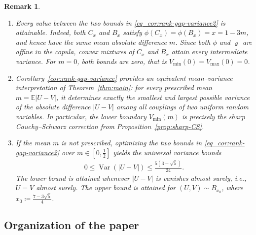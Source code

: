 \documentclass{article}
\newtheorem{remark}[theorem]{Remark}
\newcommand{\Var}{\operatorname{Var}}
\newcommand{\E}{\mathbb{E}}
\begin{document}
\begin{remark}
\label{rem:mean-variance-consequences}
\begin{enumerate}[label = (\alph*)]
    \item Every value between the two bounds in \eqref{eq_cor:rank-gap-variance2} is attainable.
    Indeed, both \(C_x\) and \(B_x\) satisfy \(\phi(C_x) = \phi(B_x)=x=1-3m\), and hence have the same mean absolute difference \(m\).
    Since both \(\phi\) and \(\varrho\) are affine in the copula, convex mixtures of \(C_x\) and \(B_x\) attain every intermediate variance.
    For \(m=0\), both bounds are zero, that is \(V_{\operatorname{min}}(0)=V_{\operatorname{max}}(0)=0\).

    \item Corollary~\ref{cor:rank-gap-variance} provides an equivalent mean--variance interpretation of Theorem~\ref{thm:main}: for every prescribed mean \(m=\E|U-V|\), it determines exactly the smallest and largest possible variance of the absolute difference \(|U-V|\) among all couplings of two uniform random variables.
    In particular, the lower boundary \(V_{\operatorname{min}}(m)\) is precisely the sharp Cauchy--Schwarz correction from Proposition~\ref{prop:sharp-CS}.

    \item If the mean \(m\) is not prescribed, optimizing the two bounds in \eqref{eq_cor:rank-gap-variance2} over \(m\in[0,\tfrac12]\) yields the universal variance bounds
    \begin{align}\label{eq_cor:rank-gap-variance}
        0
        \leq
        \Var(|U-V|)
        \leq
        \frac{5(3-\sqrt5)}{24}.
    \end{align}
    The lower bound is attained whenever \(|U-V|\) is vanishes almost surely, i.e., \(U=V\) almost surely.
    The upper bound is attained for \((U,V)\sim B_{x_0}\), where \(x_0\coloneqq\frac{7-3\sqrt5}{4}\).
\end{enumerate}
\end{remark}



\subsection{Organization of the paper}
\end{document}
